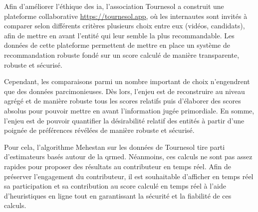 Afin d'améliorer l'éthique des \gls{ia}, l'association Tournesol a construit une plateforme collaborative \href{https://tournesol.app}{https://tournesol.app}, où les internautes sont invités à comparer selon différents critères plusieurs choix entre eux (vidéos, candidats), afin de mettre en avant l'entité qui leur semble la plus recommandable. Les données de cette plateforme permettent de mettre en place un système de recommandation robuste fondé sur un score calculé de manière transparente, robuste et sécurisé.

Cependant, les comparaisons parmi un nombre important de choix n'engendrent que des données parcimonieuses. Dès lors, l'enjeu est de reconstruire au niveau agrégé et de manière robuste tous les scores relatifs puis d'élaborer des scores absolus pour pouvoir mettre en avant l'information jugée primordiale. En somme, l'enjeu est de pouvoir quantifier la désirabilité relatif des entités à partir d'une poignée de préférences révélées de manière robuste et sécurisé.

Pour cela, l'algorithme Mehestan sur les données de Tournesol tire parti d'estimateurs basés autour de la \gls{qrmed}. Néanmoins, ces calculs ne sont pas assez rapides pour proposer des résultats au contributeur en temps réel. Afin de préserver l'engagement du contributeur, il est souhaitable d'afficher en temps réel sa participation et sa contribution au score calculé en temps réel à l'aide d'heuristiques en ligne tout en garantissant la sécurité et la fiabilité de ces calculs.

\pagebreak